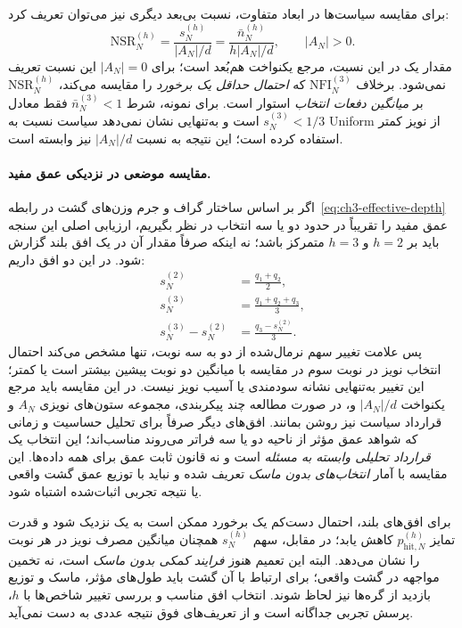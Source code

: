 برای مقایسه سیاست‌ها در ابعاد متفاوت،
نسبت بی‌بعد دیگری نیز می‌توان تعریف کرد:
\begin{equation}\label{eq:ch3-noise-normalized-uniform-ratio}
\mathrm{NSR}_N^{(h)}
=\frac{s_N^{(h)}}{|A_N|/d}
=\frac{\bar n_N^{(h)}}{h|A_N|/d},
\qquad |A_N|>0.
\end{equation}
مقدار یک در این نسبت، مرجع یکنواخت
هم‌بُعد است؛ برای $|A_N|=0$ این نسبت
تعریف نمی‌شود. برخلاف
$\mathrm{NFI}_N^{(3)}$ که
\emph{احتمال حداقل یک برخورد} را مقایسه می‌کند،
$\mathrm{NSR}_N^{(h)}$ بر
\emph{میانگین دفعات انتخاب} استوار است.
برای نمونه، شرط $\bar n_N^{(3)}<1$
فقط معادل $s_N^{(3)}<1/3$ است
و به‌تنهایی نشان نمی‌دهد سیاست نسبت
به Uniform از نویز کمتر استفاده کرده است؛
این نتیجه به نسبت $|A_N|/d$ نیز وابسته است.

\paragraph{مقایسه موضعی در نزدیکی عمق مفید.}
اگر بر اساس ساختار گراف و جرم وزن‌های گشت
در رابطه~\eqref{eq:ch3-effective-depth}
عمق مفید را تقریباً در حدود دو یا سه انتخاب
در نظر بگیریم، ارزیابی اصلی این سنجه
باید بر $h=2$ و $h=3$ متمرکز باشد؛
نه اینکه صرفاً مقدار آن در یک افق بلند
گزارش شود. در این دو افق داریم:
\begin{equation}\label{eq:ch3-noise-local-depth-comparison}
\boxed{
\begin{aligned}
s_N^{(2)}&=\frac{q_1+q_2}{2},\\
s_N^{(3)}&=\frac{q_1+q_2+q_3}{3},\\
s_N^{(3)}-s_N^{(2)}
&=\frac{q_3-s_N^{(2)}}{3}.
\end{aligned}}
\end{equation}
پس علامت تغییر سهم نرمال‌شده از دو
به سه نوبت، تنها مشخص می‌کند احتمال
انتخاب نویز در نوبت سوم در مقایسه
با میانگین دو نوبت پیشین بیشتر است
یا کمتر؛ این تغییر به‌تنهایی
نشانه سودمندی یا آسیب نویز نیست.
در این مقایسه باید مرجع یکنواخت
$|A_N|/d$ و، در صورت مطالعه چند پیکربندی،
مجموعه ستون‌های نویزی $A_N$
و قرارداد سیاست نیز روشن بمانند.
افق‌های دیگر صرفاً برای تحلیل حساسیت
و زمانی که شواهد عمق مؤثر از ناحیه
دو یا سه فراتر می‌روند مناسب‌اند؛
این انتخاب یک \emph{قرارداد تحلیلی
وابسته به مسئله} است و نه قانون
ثابت عمق برای همه داده‌ها.
این مقایسه با آمار
\emph{انتخاب‌های بدون ماسک} تعریف
شده و نباید با توزیع عمق گشت واقعی
یا نتیجه تجربی اثبات‌شده اشتباه شود.

برای افق‌های بلند، احتمال دست‌کم یک برخورد
ممکن است به یک نزدیک شود و قدرت تمایز
$ p_{\mathrm{hit},N}^{(h)} $
کاهش یابد؛ در مقابل، سهم $s_N^{(h)}$
همچنان میانگین مصرف نویز در هر نوبت را
نشان می‌دهد. البته این تعمیم هنوز
\emph{فرایند کمکی بدون ماسک} است،
نه تخمین مواجهه در گشت واقعی؛
برای ارتباط با آن گشت باید طول‌های مؤثر،
ماسک و توزیع بازدید از گره‌ها نیز لحاظ شوند.
انتخاب افق مناسب و بررسی تغییر شاخص‌ها با
$h$، پرسش تجربی جداگانه است و از
تعریف‌های فوق نتیجه عددی به دست نمی‌آید.


